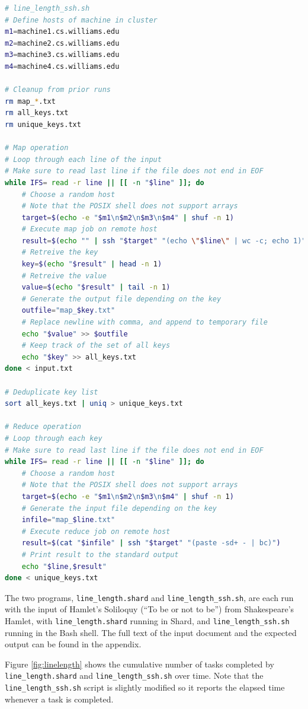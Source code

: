 \documentclass[twoside]{report}
\begin{document}
\begin{lstlisting}[language=sh]
# line_length_ssh.sh
# Define hosts of machine in cluster
m1=machine1.cs.williams.edu
m2=machine2.cs.williams.edu
m3=machine3.cs.williams.edu
m4=machine4.cs.williams.edu

# Cleanup from prior runs
rm map_*.txt
rm all_keys.txt
rm unique_keys.txt

# Map operation
# Loop through each line of the input
# Make sure to read last line if the file does not end in EOF
while IFS= read -r line || [[ -n "$line" ]]; do
    # Choose a random host
    # Note that the POSIX shell does not support arrays
    target=$(echo -e "$m1\n$m2\n$m3\n$m4" | shuf -n 1)
    # Execute map job on remote host
    result=$(echo "" | ssh "$target" "(echo \"$line\" | wc -c; echo 1)")
    # Retreive the key
    key=$(echo "$result" | head -n 1)
    # Retreive the value
    value=$(echo "$result" | tail -n 1)
    # Generate the output file depending on the key
    outfile="map_$key.txt"
    # Replace newline with comma, and append to temporary file
    echo "$value" >> $outfile
    # Keep track of the set of all keys
    echo "$key" >> all_keys.txt
done < input.txt

# Deduplicate key list
sort all_keys.txt | uniq > unique_keys.txt

# Reduce operation
# Loop through each key
# Make sure to read last line if the file does not end in EOF
while IFS= read -r line || [[ -n "$line" ]]; do
    # Choose a random host
    # Note that the POSIX shell does not support arrays
    target=$(echo -e "$m1\n$m2\n$m3\n$m4" | shuf -n 1)
    # Generate the input file depending on the key
    infile="map_$line.txt"
    # Execute reduce job on remote host
    result=$(cat "$infile" | ssh "$target" "(paste -sd+ - | bc)")
    # Print result to the standard output
    echo "$line,$result"
done < unique_keys.txt
\end{lstlisting}

The two programs, \texttt{line\_length.shard} and \texttt{line\_length\_ssh.sh}, are each run with the input of Hamlet's Soliloquy (``To be or not to be'') from Shakespeare's Hamlet, with \texttt{line\_length.shard} running in Shard, and \texttt{line\_length\_ssh.sh} running in the Bash shell.
The full text of the input document and the expected output can be found in the appendix.

Figure \ref{fig:linelength} shows the cumulative number of tasks completed by \texttt{line\_length.shard} and \texttt{line\_length\_ssh.sh} over time.
Note that the \texttt{line\_length\_ssh.sh} script is slightly modified so it reports the elapsed time whenever a task is completed.
\end{document}
